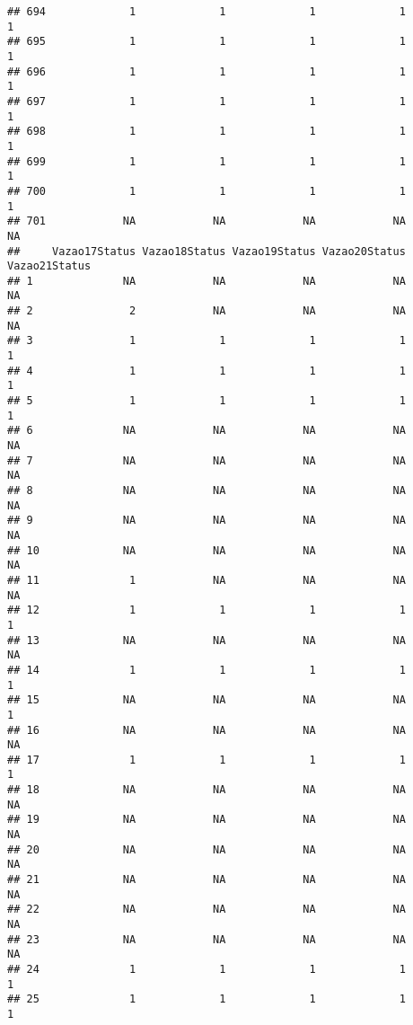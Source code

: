 \documentclass[
]{article}
\begin{document}
\begin{verbatim}
## 694             1             1             1             1             1
## 695             1             1             1             1             1
## 696             1             1             1             1             1
## 697             1             1             1             1             1
## 698             1             1             1             1             1
## 699             1             1             1             1             1
## 700             1             1             1             1             1
## 701            NA            NA            NA            NA            NA
##     Vazao17Status Vazao18Status Vazao19Status Vazao20Status Vazao21Status
## 1              NA            NA            NA            NA            NA
## 2               2            NA            NA            NA            NA
## 3               1             1             1             1             1
## 4               1             1             1             1             1
## 5               1             1             1             1             1
## 6              NA            NA            NA            NA            NA
## 7              NA            NA            NA            NA            NA
## 8              NA            NA            NA            NA            NA
## 9              NA            NA            NA            NA            NA
## 10             NA            NA            NA            NA            NA
## 11              1            NA            NA            NA            NA
## 12              1             1             1             1             1
## 13             NA            NA            NA            NA            NA
## 14              1             1             1             1             1
## 15             NA            NA            NA            NA             1
## 16             NA            NA            NA            NA            NA
## 17              1             1             1             1             1
## 18             NA            NA            NA            NA            NA
## 19             NA            NA            NA            NA            NA
## 20             NA            NA            NA            NA            NA
## 21             NA            NA            NA            NA            NA
## 22             NA            NA            NA            NA            NA
## 23             NA            NA            NA            NA            NA
## 24              1             1             1             1             1
## 25              1             1             1             1             1

\end{verbatim}
\end{document}
